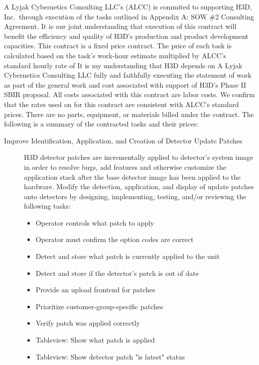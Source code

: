 \documentclass[8pt, letterpaper]{awesome-cv} %
\begin{document}
\makecvheader %

\makelettertitle %


\begin{cvletter}
  A Lyjak Cybernetics Consulting LLC's (ALCC) is commited to supporting H3D, Inc.\ through execution
  of the tasks outlined in Appendix A: SOW \#2 Consulting Agreement. It is our joint understanding
  that execution of this contract will benefit the efficiency and quality of H3D's production and
  product development capacities. This contract is a fixed price contract. The price of each task is
  calculated based on the task's work-hour estimate multiplied by ALCC's standard hourly rate of
   It is my understanding that H3D depends on A Lyjak Cybernetics
  Consulting LLC fully and faithfully executing the statement of work as part of the general work
  and cost associated with support of H3D's Phase II SBIR proposal. All costs associated with this
  contract are labor costs. We confirm that the rates used on for this contract are consistent with
  ALCC's standard prices. There are no parts, equipment, or materials billed under the contract. The
  following is a summary of the contracted tasks and their prices:

  \begin{description}
    \item[Improve Identification, Application, and Creation of Detector Update Patches] H3D detector
      patches are incrementally applied to detector’s system image in order to resolve bugs, add
      features and otherwise customize the application stack after the base detector image has been
      applied to the hardware.  Modify the detection, application, and display of update patches
      onto detectors by designing, implementing, testing, and/or reviewing the following tasks:

      \begin{itemize}
        \item Operator controls what patch to apply
        \item Operator must confirm the option codes are correct
        \item Detect and store what patch is currently applied to the unit
        \item Detect and store if the detector’s patch is out of date
        \item Provide an upload frontend for patches
        \item Prioritize customer-group-specific patches
        \item Verify patch was applied correctly
        \item Tableview: Show what patch is applied
        \item Tableview: Show detector patch "is latest" status
      \end{itemize}


\end{description}
\end{cvletter}
\end{document}
